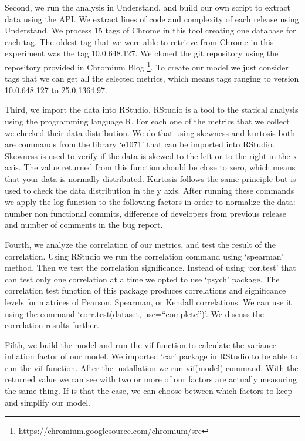 Second, we run the analysis in Understand, and build our own script to extract data using the API. We extract lines of code and complexity of each release using Understand. We process 15 tags of Chrome in this tool creating one database for each tag. The oldest tag that we were able to retrieve from Chrome in this experiment was the tag 10.0.648.127. We cloned the git repository using the repository provided in Chromium Blog \footnote{https://chromium.googlesource.com/chromium/src}. To create our model we just consider tags that we can get all the selected metrics, which means tags ranging to version 10.0.648.127 to 25.0.1364.97.

Third, we import the data into RStudio. RStudio is a tool to the statical analysis using the programming language R. For each one of the metrics that we collect we checked their data distribution. We do that using skewness and kurtosis both are commands from the library `e1071' that can be imported into RStudio. Skewness is used to verify if the data is skewed to the left or to the right in the x axis. The value returned from this function should be close to zero, which means that your data is normally distributed. Kurtosis follows the same principle but is used to check the data distribution in the y axis. After running these commands we apply the log function to the following factors in order to normalize the data: number non functional commits, difference of developers from previous release and number of comments in the bug report. 

Fourth, we analyze the correlation of our metrics,  and test the result of the correlation. Using RStudio we run the correlation command using `spearman' method. Then we test the correlation significance. Instead of using `cor.test' that can test only one correlation at a time we opted to use `psych' package. The correlation test function of this package produces correlations and significance levels for matrices of Pearson, Spearman, or Kendall correlations. We can use it using the command `corr.test(dataset, use=``complete'')'. We discuss the correlation results further. 

Fifth, we build the model and run the vif function to calculate the variance inflation factor of our model. We imported `car' package in RStudio to be able to run the vif function.
After the installation we run vif(model) command. With the returned value we can see with two or more of our factors are actually measuring the same thing. If is that the case, we can choose between which factors to keep and simplify our model.  

